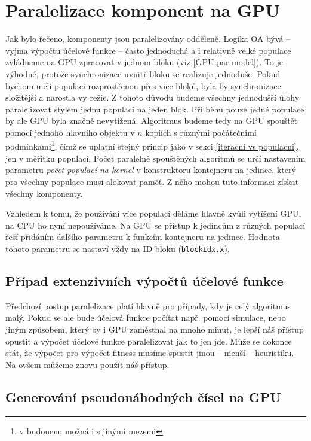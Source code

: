 \section{Paralelizace komponent na GPU}\label{paralelizace komp}

Jak bylo řečeno, komponenty jsou paralelizovány odděleně. Logika OA bývá -- vyjma výpočtu účelové funkce -- často jednoduchá a i relativně velké populace zvládneme na GPU zpracovat v jednom bloku (viz \ref{GPU par model}). To je výhodné, protože synchronizace uvnitř bloku se realizuje jednoduše. Pokud bychom měli populaci rozprostřenou přes více bloků, byla by synchronizace složitější a narostla vy režie. Z tohoto důvodu budeme všechny jednodušší úlohy paralelizovat stylem jednu populaci na jeden blok. Při běhu pouze jedné populace by ale GPU byla značně nevytížená. Algoritmus budeme tedy na GPU spouštět pomocí jednoho hlavního objektu v $n$ kopiích s různými počátečními podmínkami\footnote{v budoucnu možná i s jinými mezemi}, čímž se uplatní stejný princip jako v sekci \ref{iteracni vs populacni}, jen v měřítku populací. Počet paralelně spouštěných algoritmů se určí nastavením parametru \emph{počet populací na kernel} v konstruktoru kontejneru na jedince, který pro všechny populace musí alokovat paměť. Z něho mohou tuto informaci získat všechny komponenty.

Vzhledem k tomu, že používání více populací děláme hlavně kvůli vytížení GPU, na CPU ho nyní nepoužíváme. Na GPU se přístup k jedincům z různých populací řeší přidáním dalšího parametru k funkcím kontejneru na jedince. Hodnota tohoto parametru se nastaví vždy na ID bloku (\texttt{blockIdx.x}).

\subsection{Případ extenzivních výpočtů účelové funkce}

Předchozí postup paralelizace platí hlavně pro případy, kdy je celý algoritmus \bq malý\eq. Pokud se ale bude účelová funkce počítat např. pomocí simulace, nebo jiným způsobem, který by i GPU zaměstnal na mnoho minut, je lepší náš přístup opustit a výpočet účelové funkce paralelizovat jak to jen jde. Může se dokonce stát, že výpočet pro výpočet fitness musíme spustit jinou -- menší -- heuristiku. Na ovšem můžeme znovu použít náš přístup.

\subsection{Generování pseudonáhodných čísel na GPU}


